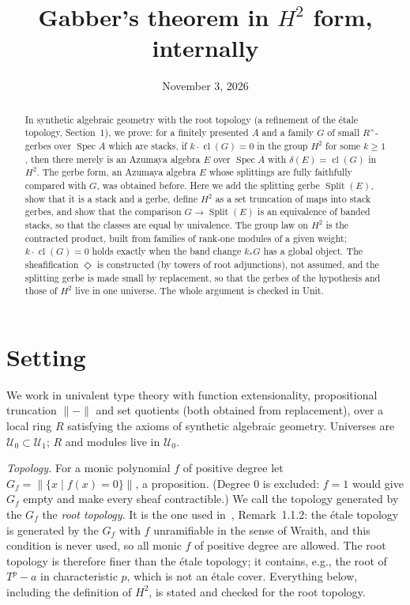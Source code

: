 \documentclass[11pt]{amsart}
\title{Gabber's theorem in $H^2$ form, internally}
\date{November 3, 2026}
\theoremstyle{definition}
\theoremstyle{remark}
\newcommand{\Spec}{\operatorname{Spec}}
\newcommand{\Split}{\operatorname{Split}}
\newcommand{\cl}{\operatorname{cl}}
\newcommand{\close}{\Diamond}
\newcommand{\tr}[1]{\|#1\|}
\newcommand{\Rx}{R^\times}
\newcommand{\U}{\mathcal U}
\begin{document}
\begin{abstract}
In synthetic algebraic geometry with the root topology (a refinement of the
\'etale topology, Section~1), we prove: for a finitely presented $A$ and a
family $G$ of small $\Rx$-gerbes over $\Spec A$ which are stacks, if
$k\cdot\cl(G)=0$ in the group $H^2$ for some $k\geq1$, then there merely is
an Azumaya algebra $E$ over $\Spec A$ with $\delta(E)=\cl(G)$ in $H^2$. The gerbe form, an Azumaya algebra $E$ whose
splittings are fully faithfully compared with $G$, was obtained before. Here
we add the splitting gerbe $\Split(E)$, show that it is a stack and a gerbe,
define $H^2$ as a set truncation of maps into stack gerbes, and show that
the comparison $G\to\Split(E)$ is an equivalence of banded stacks, so that
the classes are equal by univalence. The group law on $H^2$ is the
contracted product, built from families of rank-one modules of a given
weight; $k\cdot\cl(G)=0$ holds exactly when the band change $k_*G$ has a
global object. The sheafification $\close$ is
constructed (by towers of root adjunctions), not assumed, and the splitting
gerbe is made small by replacement, so that the gerbes of the hypothesis and
those of $H^2$ live in one universe. The whole argument is checked in Unit.
\end{abstract}
\maketitle

\section{Setting}

We work in univalent type theory with function extensionality, propositional
truncation $\tr{-}$ and set quotients (both obtained from replacement), over
a local ring $R$ satisfying the axioms of synthetic algebraic geometry.
Universes are $\U_0\subset\U_1$; $R$ and modules live in
$\U_0$.

\emph{Topology.} For a monic polynomial $f$ of positive degree let
$G_f=\tr{\{x\mid f(x)=0\}}$, a proposition. (Degree $0$ is excluded: $f=1$
would give $G_f$ empty and make every sheaf contractible.) We call the
topology generated by the $G_f$ the \emph{root topology}. It is the one used
in~\cite{sevb}, Remark~1.1.2: the \'etale topology is generated by the
$G_f$ with $f$ unramifiable in the sense of Wraith, and this condition is
never used, so all monic $f$ of positive degree are allowed. The root
topology is therefore finer than the \'etale topology; it contains, e.g.,
the root of $T^p-a$ in characteristic $p$, which is not an \'etale cover.
Everything below, including the definition of $H^2$, is stated and checked
for the root topology.
\end{document}
